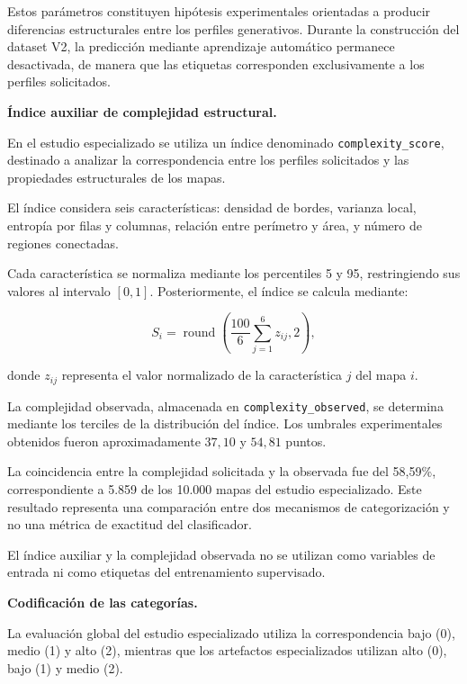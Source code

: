 \FloatBarrier

Estos parámetros constituyen hipótesis experimentales orientadas a producir diferencias estructurales entre los perfiles generativos. Durante la construcción del dataset V2, la predicción mediante aprendizaje automático permanece desactivada, de manera que las etiquetas corresponden exclusivamente a los
perfiles solicitados.

\textbf{Índice auxiliar de complejidad estructural.}

En el estudio especializado se utiliza un índice denominado \texttt{complexity\_score}, destinado a analizar la correspondencia entre los perfiles solicitados y las propiedades estructurales de los mapas.

El índice considera seis características: densidad de bordes, varianza local, entropía por filas y columnas, relación entre perímetro y área, y número de regiones conectadas.

Cada característica se normaliza mediante los percentiles 5 y 95, restringiendo sus valores al intervalo $[0,1]$. Posteriormente, el índice se calcula mediante:

\begin{equation}
	S_i =
	\operatorname{round}
	\left(
	\frac{100}{6}
	\sum_{j=1}^{6} z_{ij},
	2
	\right),
	\label{eq:indice_complejidad_estructural}
\end{equation}

donde $z_{ij}$ representa el valor normalizado de la característica $j$ del mapa $i$.

La complejidad observada, almacenada en \texttt{complexity\_observed}, se determina mediante los terciles de la distribución del índice. Los umbrales experimentales obtenidos fueron aproximadamente $37{,}10$ y $54{,}81$ puntos.

La coincidencia entre la complejidad solicitada y la observada fue del 58,59\%, correspondiente a 5.859 de los 10.000 mapas del estudio especializado. Este resultado representa una comparación entre dos mecanismos de categorización y no una métrica de exactitud del clasificador.

El índice auxiliar y la complejidad observada no se utilizan como variables de entrada ni como etiquetas del entrenamiento supervisado.

\textbf{Codificación de las categorías.}

La evaluación global del estudio especializado utiliza la correspondencia bajo (0), medio (1) y alto (2), mientras que los artefactos especializados utilizan alto (0), bajo (1) y medio (2).

